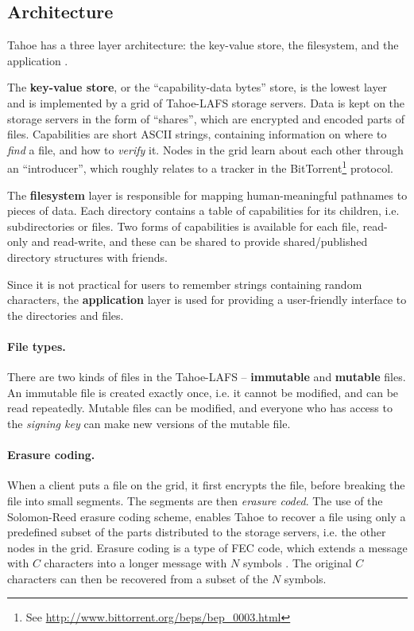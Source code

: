 \documentclass[english,12pt,a4paper]{book}
\begin{document}
\subsection{Architecture}

Tahoe has a three layer architecture: the key-value store, the filesystem, and
the application \cite{t_tahoe}.

The \textbf{key-value store}, or the ``capability-data bytes'' store, is the
lowest layer and is implemented by a grid of Tahoe-LAFS storage servers. Data is
kept on the storage servers in the form of ``shares'', which are encrypted and
encoded parts of files. Capabilities are short ASCII strings, containing
information on where to \emph{find} a file, and how to \emph{verify} it.
Nodes in the grid learn about each other through an ``introducer'', which
roughly relates to a tracker in the BitTorrent\footnote{See
\url{http://www.bittorrent.org/beps/bep\_0003.html}} protocol.

The \textbf{filesystem} layer is responsible for mapping human-meaningful
pathnames to pieces of data. Each directory contains a table of capabilities
for its children, i.e. subdirectories or files. Two forms of capabilities is
available for each file, read-only and read-write, and these can be shared to
provide shared/published directory structures with friends.

Since it is not practical for users to remember strings containing random
characters, the \textbf{application} layer is used for providing a user-friendly
interface to the directories and files.

\paragraph{File types.}

There are two kinds of files in the Tahoe-\ac{LAFS} -- \textbf{immutable} and
\textbf{mutable} files. An immutable file is created exactly once, i.e. it
cannot be modified, and can be read repeatedly. Mutable files can be modified,
and everyone who has access to the \emph{signing key} can make new versions of
the mutable file.

\paragraph{Erasure coding.}

When a client puts a file on the grid, it first encrypts the file, before
breaking the file into small segments. The segments are then \emph{erasure
coded}.  The use of the Solomon-Reed erasure coding scheme, enables Tahoe to
recover a file using only a predefined subset of the parts distributed to the
storage servers, i.e. the other nodes in the grid. Erasure coding is a type of
\ac{FEC} code, which extends a message with $C$ characters into a longer message
with $N$ symbols \cite{t_reed-solomon}.  The original $C$ characters can then be
recovered from a subset of the $N$ symbols.
\end{document}
